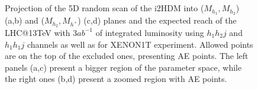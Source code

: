 \documentclass[12pt,a4paper]{article}
\begin{document}
%
\begin{figure}[htb]
%
\\
%
\\
\caption{\label{collider-XENON1T-constraint-AE-other}
Projection of the 5D random scan of the i2HDM into ($M_{h_1},M_{h_2}$) (a,b)
and ($M_{h_2},M_{h^+}$) (c,d) planes
and the expected  reach of the LHC@13TeV with 3$ab^{-1}$ of integrated luminosity 
using  $h_1 h_2 j$  and  $h_1 h_1 j$ channels as well as for XENON1T experiment.
Allowed points are on the top of the excluded ones,
presenting AE points. The left panels (a,c) present a bigger region of the parameter space, while the
right ones (b,d) present a zoomed region with AE points.} 
\end{figure}
\end{document}
